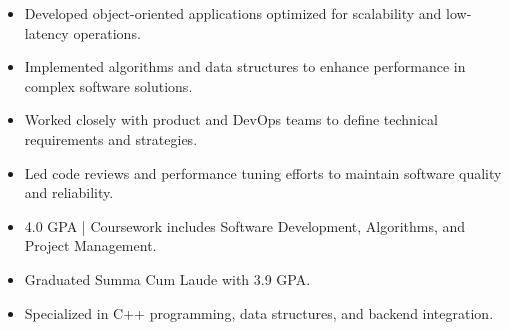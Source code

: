 \par\smallskip
\noindent
\begin{minipage}{20cm}
  \begin{minipage}{9.75cm}
    \begin{itemize}
      \item Developed object-oriented applications optimized for scalability and low-latency operations.
      \item Implemented algorithms and data structures to enhance performance in complex software solutions.
    \end{itemize}
  \end{minipage}
  \hfill
  \begin{minipage}{9.75cm}
    \begin{itemize}
      \item Worked closely with product and DevOps teams to define technical requirements and strategies.
      \item Led code reviews and performance tuning efforts to maintain software quality and reliability.
    \end{itemize}
  \end{minipage}
\end{minipage}
\par\smallskip
\divider

\begin{itemize}
  \item 4.0 GPA | Coursework includes Software Development, Algorithms, and Project Management.
\end{itemize}
\divider

\begin{itemize}
  \item Graduated Summa Cum Laude with 3.9 GPA.
  \item Specialized in C++ programming, data structures, and backend integration.
\end{itemize}

\noindent
\begin{minipage}{20cm}
\end{minipage}


